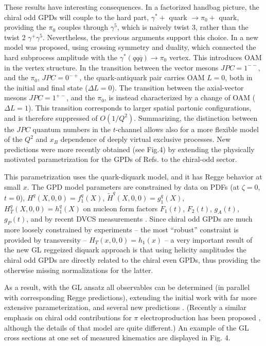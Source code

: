     These results have interesting consequences. In a factorized handbag picture, the chiral odd GPDs will couple to the hard part, $\gamma^{*} +$ quark $\rightarrow \pi_0 +$ quark, providing the $\pi_0$ couples through $\gamma^5$, which is naively twist 3, rather than the twist 2 $\gamma^+ \gamma^5$. Nevertheless, the previous arguments support this choice. In \cite{9} a new model was proposed, using crossing symmetry and duality, which connected the hard subprocess amplitude with the $\gamma^{*}(qq\overline{q}) \rightarrow \pi_0$ vertex. This introduces OAM in the vertex structure. In the transition between the vector mesons $J P C = 1^{−−}$, and the $\pi_0$, $J P C = 0^{−+}$, the quark-antiquark pair carries OAM $L = 0$, both in the initial and final state ($\Delta L = 0$). The transition between the axial-vector mesons $J P C = 1^{+−}$, and the $\pi_0$, is instead characterized by a change of OAM ($\Delta L = 1$). This transition corresponds to larger spatial partonic configurations, and is therefore suppressed of $O(1/Q^2)$. Summarizing, the distinction between the $J P C$ quantum numbers in the $t$-channel allows also for a more flexible model of the $Q^2$ and $x_B$ dependence of deeply virtual exclusive processes. New predictions were more recently obtained (see Fig.4) by extending the physically motivated parametrization for the GPDs of Refs.\cite{11, 25} to the chiral-odd sector.
    
    This parametrization uses the quark-diquark model, and it has Regge behavior at small $x$. The GPD model parameters are constrained by data on PDFs (at $\zeta = 0$, $t = 0$), $H^q (X, 0, 0) = f^q_1 (X)$, $\tilde{H}^q (X, 0, 0) = g^q_1 (X)$, $H^q_T (X, 0, 0) = h^q_1 (X)$ on nucleon form factors $F_1(t)$, $F_2(t)$, $g_A(t)$, $g_P (t)$, and by recent DVCS measurements \cite{2} \cite{3}. Since chiral odd GPDs are much more loosely constrained by experiments – the most “robust” constraint is provided by transversity – $H_T (x, 0, 0) = h_1(x)$ – a very important result of the new GL reggeized diquark approach \cite{10} is that using helicity amplitudes the chiral odd GPDs are directly related to the chiral even GPDs, thus providing the otherwise missing normalizations for the latter.
    
    As a result, with the GL ansatz all observables can be determined (in parallel with corresponding Regge predictions), extending the initial work \cite{9} with far more extensive parameterization, and several new predictions \cite{11, 10}. (Recently a similar emphasis on chiral odd contributions for $\pi$ electroproduction has been proposed \cite{5}, although the details of that model are quite different.) An example of the GL cross sections at one set of measured kinematics are displayed in Fig. 4.
    \fi

